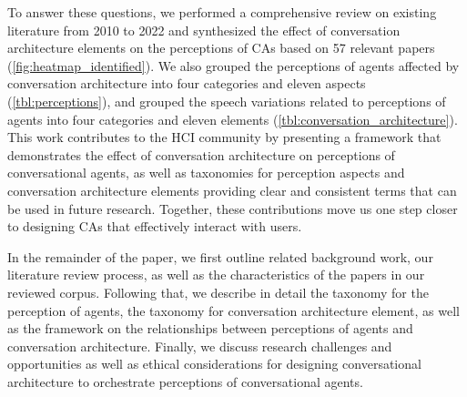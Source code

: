 To answer these questions, we performed a comprehensive review on existing literature from 2010 to 2022 and synthesized the effect of conversation architecture elements on the perceptions of CAs based on 57 relevant papers (\autoref{fig:heatmap_identified}). We also grouped the perceptions of agents affected by conversation architecture into four categories and eleven aspects (\autoref{tbl:perceptions}), and grouped the speech variations related to perceptions of agents into four categories and eleven elements (\autoref{tbl:conversation_architecture}). %
This work contributes to the HCI community by presenting a framework that demonstrates the effect of conversation architecture on perceptions of conversational agents, as well as taxonomies for perception aspects and conversation architecture elements providing clear and consistent terms that can be used in future research. Together, these contributions move us one step closer to designing CAs that effectively interact with users. 

In the remainder of the paper, we first outline related background work, our literature review process, as well as the characteristics of the papers in our reviewed corpus. Following that, we describe in detail the taxonomy for the perception of agents, the taxonomy for conversation architecture element, as well as the framework on the relationships between perceptions of agents and conversation architecture. Finally, we discuss research challenges and opportunities as well as ethical considerations for designing conversational architecture to orchestrate perceptions of conversational agents.